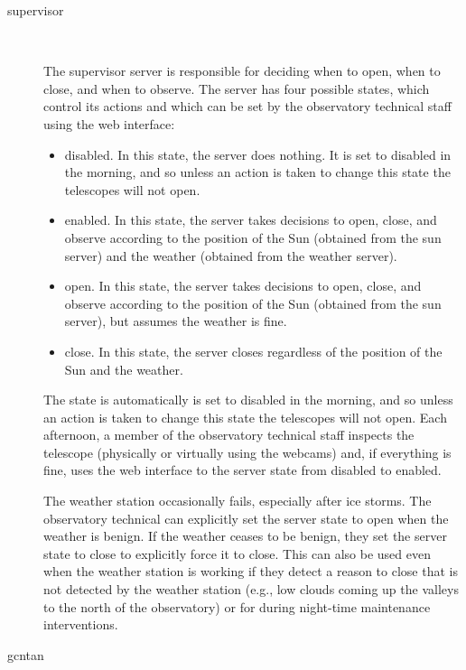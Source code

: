 \documentclass{article}
\newcommand{\server}[1]{{\ttfamily #1}}
\newcommand{\variable}[1]{{\ttfamily #1}}
\begin{document}
\begin{description}

\item[\server{supervisor}]~

The \server{supervisor} server is responsible for deciding when to open, when to close, and when to observe. The server has four possible states, which control its actions and which can be set by the observatory technical staff using the web interface:

\begin{itemize}
\item \variable{disabled}. In this state, the server does nothing. It is set to disabled in the morning, and so unless an action is taken to change this state the telescopes will not open.
\item \variable{enabled}. In this state, the server takes decisions to open, close, and observe according to the position of the Sun (obtained from the \server{sun} server) and the weather (obtained from the \server{weather} server). 
\item \variable{open}. In this state, the server takes decisions to open, close, and observe according to the position of the Sun (obtained from the \server{sun} server), but assumes the weather is fine. 
\item \variable{close}. In this state, the server closes regardless of the position of the Sun and the weather. 
\end{itemize}

The state is automatically is set to \variable{disabled} in the morning, and so unless an action is taken to change this state the telescopes will not open. Each afternoon, a member of the observatory technical staff inspects the telescope (physically or virtually using the webcams) and, if everything is fine, uses the web interface to the server state from \variable{disabled} to \variable{enabled}.

The weather station occasionally fails, especially after ice storms. The observatory technical can explicitly set the server state to \server{open} when the weather is benign. If the weather ceases to be benign, they set the server state to \server{close} to explicitly force it to close. This can also be used even when the weather station is working if they detect a reason to close that is not detected by the weather station (e.g., low clouds coming up the valleys to the north of the observatory) or for during night-time maintenance interventions.

\item[\server{gcntan}]~


\end{description}
\end{document}
